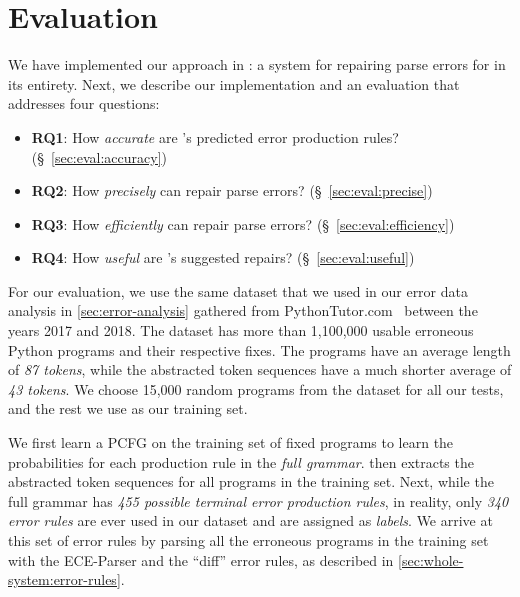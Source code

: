 \section{Evaluation}
\label{sec:eval}


We have implemented our approach in \toolname: a system for repairing parse
errors for \python in its entirety. Next, we describe our implementation and an
evaluation that addresses four questions:

\begin{itemize}
    \item \textbf{RQ1}: How \emph{accurate} are \toolname's predicted error production rules?
                        (\S~\ref{sec:eval:accuracy})
    \item \textbf{RQ2}: How \emph{precisely} can \toolname repair parse errors?
                        (\S~\ref{sec:eval:precise})
    \item \textbf{RQ3}: How \emph{efficiently} can \toolname repair parse errors?
                        (\S~\ref{sec:eval:efficiency})
    \item \textbf{RQ4}: How \emph{useful} are \toolname's suggested repairs?
                        (\S~\ref{sec:eval:useful})
\end{itemize}


For our evaluation, we use the same \python dataset that we used in our error
data analysis in \autoref{sec:error-analysis} gathered from
PythonTutor.com~\citep{Guo2013} between the years 2017 and 2018. The dataset has
more than 1,100,000 usable erroneous Python programs and their respective fixes.
The programs have an average length of \emph{87 tokens}, while the abstracted
token sequences have a much shorter average of \emph{43 tokens}. We choose
15,000 random programs from the dataset for all our tests, and the rest we use
as our training set.

We first learn a PCFG on the training set of fixed programs to learn the
probabilities for each production rule in the \emph{full \python grammar}.
\toolname then extracts the abstracted token sequences for all programs in the
training set. Next, while the full \python grammar has \emph{455 possible
terminal error production rules}, in reality, only \emph{340 error rules} are
ever used in our dataset and are assigned as \emph{labels}. We arrive at this
set of error rules by parsing all the erroneous programs in the training set
with the ECE-Parser and the ``diff'' error rules, as described in
\autoref{sec:whole-system:error-rules}.

